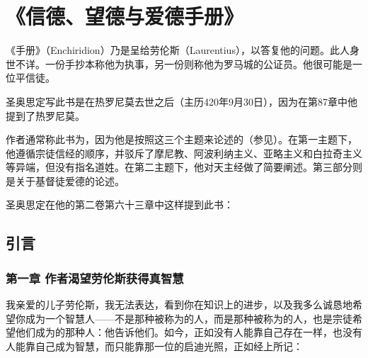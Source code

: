 
\chapter{《信德、望德与爱德手册》}


《手册》（Enchiridion）乃是呈给劳伦斯（Laurentius），以答复他的问题。此人身世不详。一份手抄本称他为执事，另一份则称他为罗马城的公证员。他很可能是一位平信徒。\par

圣奥思定写此书是在热罗尼莫去世之后（主历420年9月30日），因为在第87章中他提到了热罗尼莫。\par

作者通常称此书为，因为他是按照这三个主题来论述的（参见）。在第一主题下，他遵循宗徒信经的顺序，并驳斥了摩尼教、阿波利纳主义、亚略主义和白拉奇主义等异端，但没有指名道姓。在第二主题下，他对天主经做了简要阐述。第三部分则是关于基督徒爱德的论述。\par

圣奥思定在他的第二卷第六十三章中这样提到此书：\par


\section{引言}


\subsection{第一章 作者渴望劳伦斯获得真智慧}

我亲爱的儿子劳伦斯，我无法表达，看到你在知识上的进步，以及我多么诚恳地希望你成为一个智慧人——不是那种被称为的人，而是那种被称为的人，也是宗徒希望他们成为的那种人：他告诉他们。如今，正如没有人能靠自己存在一样，也没有人能靠自己成为智慧，而只能靠那一位的启迪光照，正如经上所记：\par

